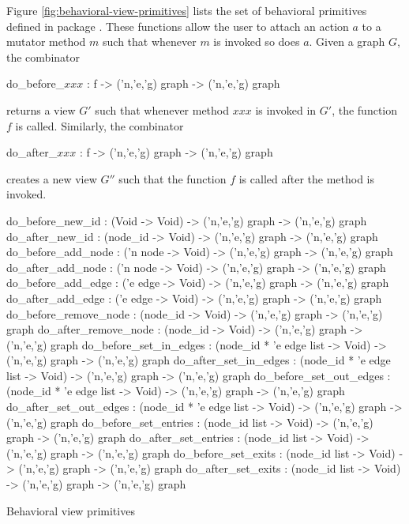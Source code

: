 Figure \ref{fig:behavioral-view-primitives} lists
the set of behavioral primitives defined
in package .  
These functions allow the user
to attach an action $a$ to a mutator method $m$ such that whenever $m$
is invoked so does $a$.  Given a graph $G$, the combinator 
\begin{SML}
   do_before_\(xxx\) : f -> ('n,'e,'g) graph -> ('n,'e,'g) graph
\end{SML}
\noindent returns a view $G'$ such that whenever method $xxx$ is invoked
in $G'$, the function $f$ is called. 
Similarly, the combinator 
\begin{SML}
   do_after_\(xxx\) : f -> ('n,'e,'g) graph -> ('n,'e,'g) graph
\end{SML}
\noindent creates a new view $G''$ such that the function $f$
is called after the method is invoked.
\begin{Figure}
\begin{boxit}
\begin{SML}
 do_before_new_id : (Void -> Void) -> ('n,'e,'g) graph -> ('n,'e,'g) graph
 do_after_new_id : (node_id -> Void) -> ('n,'e,'g) graph -> ('n,'e,'g) graph
 do_before_add_node : ('n node -> Void) -> ('n,'e,'g) graph -> ('n,'e,'g) graph
 do_after_add_node : ('n node -> Void) -> ('n,'e,'g) graph -> ('n,'e,'g) graph
 do_before_add_edge : ('e edge -> Void) -> ('n,'e,'g) graph -> ('n,'e,'g) graph
 do_after_add_edge : ('e edge -> Void) -> ('n,'e,'g) graph -> ('n,'e,'g) graph
 do_before_remove_node : (node_id -> Void) -> ('n,'e,'g) graph -> ('n,'e,'g) graph
 do_after_remove_node : (node_id -> Void) -> ('n,'e,'g) graph -> ('n,'e,'g) graph 
 do_before_set_in_edges : (node_id * 'e edge list -> Void) -> 
    ('n,'e,'g) graph -> ('n,'e,'g) graph
 do_after_set_in_edges : (node_id * 'e edge list -> Void) -> 
    ('n,'e,'g) graph -> ('n,'e,'g) graph
 do_before_set_out_edges : (node_id * 'e edge list -> Void) -> 
    ('n,'e,'g) graph -> ('n,'e,'g) graph
 do_after_set_out_edges : (node_id * 'e edge list -> Void) -> 
    ('n,'e,'g) graph -> ('n,'e,'g) graph
 do_before_set_entries : (node_id list -> Void) -> ('n,'e,'g) graph -> ('n,'e,'g) graph
 do_after_set_entries : (node_id list -> Void) -> ('n,'e,'g) graph -> ('n,'e,'g) graph
 do_before_set_exits : (node_id list -> Void) -> ('n,'e,'g) graph -> ('n,'e,'g) graph
 do_after_set_exits : (node_id list -> Void) -> ('n,'e,'g) graph -> ('n,'e,'g) graph
\end{SML}
\end{boxit}
\label{fig:behavioral-view-primitives} 
\caption{Behavioral view primitives}
\end{Figure}

